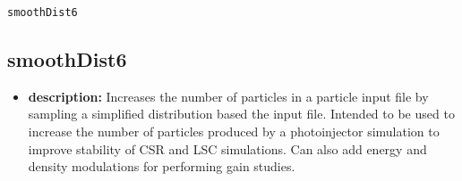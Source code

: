 \documentclass[11pt]{article}
\begin{document}
\begin{latexonly}
\newpage
\begin{center}{\Large\verb|smoothDist6|}\end{center}
\end{latexonly}
\subsection{smoothDist6}

\begin{itemize}
\item {\bf description:} Increases the number of particles in a particle input file by
 sampling a simplified distribution based the input file.  Intended to be used to increase the number of particles
 produced by a photoinjector simulation to improve stability of CSR and LSC simulations.
 Can also add energy and density modulations for performing gain studies.


\end{itemize}
\end{document}

